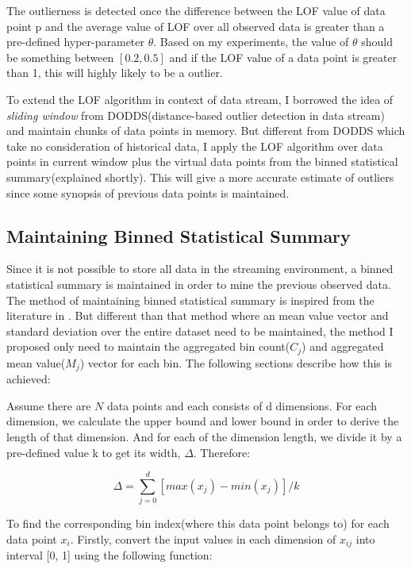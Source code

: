 \documentclass[11pt]{article}       %
\begin{document}
The outlierness is detected once the difference between the LOF value of data point p and the average value of LOF over all observed data is greater than a pre-defined hyper-parameter $\theta$. Based on my experiments, the value of $\theta$ should be something between $[0.2, 0.5]$ and if the LOF value of a data point is greater than 1, this will highly likely to be a outlier.

To extend the LOF algorithm in context of data stream, I borrowed the idea of \textit{sliding window} from DODDS(distance-based outlier detection in data stream) and maintain chunks of data points in memory. But different from DODDS which take no consideration of historical data, I apply the LOF algorithm over data points in current window plus the virtual data points from the binned statistical summary(explained shortly). This will give a more accurate estimate of outliers since some synopsis of previous data points is maintained.

\subsection{Maintaining Binned Statistical Summary} \label{subsect2}

Since it is not possible to store all data in the streaming environment, a binned statistical summary is maintained in order to mine the previous observed data. The method of maintaining binned statistical summary is inspired from the literature in \cite{7516110}. But different than that method where an mean value vector and standard deviation over the entire dataset need to be maintained, the method I proposed only need to maintain the aggregated bin count($C_j$) and aggregated mean value($M_j$) vector for each bin. The following sections describe how this is achieved:

Assume there are $N$ data points and each consists of d dimensions. For each dimension, we calculate the upper bound and lower bound in order to derive the length of that dimension. And for each of the dimension length, we divide it by a pre-defined value k to get its width, $\Delta$.  Therefore:

\[ \Delta = \sum_{j=0}^{d} [max(x_j) - min(x_j)] / k \]

To find the corresponding bin index(where this data point belongs to) for each data point $x_i$. Firstly, convert the input values in each dimension of $x_{ij}$ into interval [0, 1] using the following function:
\end{document}
